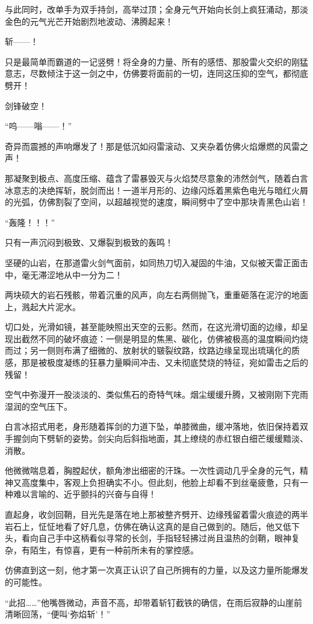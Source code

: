 与此同时，改单手为双手持剑，高举过顶；全身元气开始向长剑上疯狂涌动，那淡金色的元气光芒开始剧烈地波动、沸腾起来！

斩——！

只是最简单而霸道的一记竖劈！将全身的力量、所有的感悟、那股雷火交织的刚猛意志，尽数倾注于这一剑之中，仿佛要将面前的一切，连同这压抑的空气，都彻底劈开！

剑锋破空！

“呜——嗡——！”

奇异而震撼的声响爆发了！那是低沉如闷雷滚动、又夹杂着仿佛火焰爆燃的风雷之声！

那凝聚到极点、高度压缩、蕴含了雷暴毁灭与火焰焚尽意象的沛然剑气，随着白言冰意志的决绝挥斩，脱剑而出！一道半月形的、边缘闪烁着黑紫色电光与暗红火屑的光弧，仿佛割裂了空间，以超越视觉的速度，瞬间劈中了空中那块青黑色山岩！

“轰隆！！！”

只有一声沉闷到极致、又爆裂到极致的轰鸣！

坚硬的山岩，在那道雷火剑气面前，如同热刀切入凝固的牛油，又似被天雷正面击中，毫无滞涩地从中一分为二！

两块硕大的岩石残骸，带着沉重的风声，向左右两侧抛飞，重重砸落在泥泞的地面上，溅起大片泥水。

切口处，光滑如镜，甚至能映照出天空的云影。然而，在这光滑切面的边缘，却呈现出截然不同的破坏痕迹：一侧是明显的焦黑、碳化，仿佛被极高的温度瞬间灼烧而过；另一侧则布满了细微的、放射状的皲裂纹路，纹路边缘呈现出琉璃化的质感，那是被极度凝练的狂暴力量瞬间冲击、又未彻底焚烧的特征，宛如雷击之后的残留！

空气中弥漫开一股淡淡的、类似焦石的奇特气味。烟尘缓缓升腾，又被刚刚下完雨湿润的空气压下。

白言冰招式用老，身形随着挥剑的力道下坠，单膝微曲，缓冲落地，依旧保持着双手握剑向下劈斩的姿势。剑尖向后斜指地面，其上缭绕的赤红银白细芒缓缓黯淡、消散。

他微微喘息着，胸膛起伏，额角渗出细密的汗珠。一次性调动几乎全身的元气，精神又高度集中，客观上负担确实不小。但此刻，他脸上却看不到丝毫疲惫，只有一种难以言喻的、近乎颤抖的兴奋与自得！

直起身，收剑回鞘，目光先是落在地上那被整齐劈开、边缘残留着雷火痕迹的两半岩石上，怔怔地看了好几息，仿佛在确认这真的是自己做到的。随后，他又低下头，看向自己手中这柄看似寻常的长剑，手指轻轻拂过尚且温热的剑鞘，眼神复杂，有陌生，有惊喜，更有一种前所未有的掌控感。

仿佛直到这一刻，他才第一次真正认识了自己所拥有的力量，以及这力量所能爆发的可能性。

“此招……”他嘴唇微动，声音不高，却带着斩钉截铁的确信，在雨后寂静的山崖前清晰回荡，“便叫‘弥焰斩’！”

